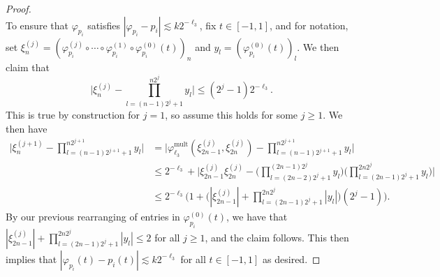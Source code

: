 \documentclass[a4paper, 11pt, headings = small, abstract]{scrartcl}
\begin{document}
\begin{proof}
\[	\]
	To ensure that $\varphi_{p_i}$ satisfies $|\varphi_{p_i}-p_i|\lesssim k2^{-\ell_3}$, fix $t\in[-1, 1]$, and for notation, set $\xi^{(j)}_n=(\varphi_{p_i}^{(j)}\circ\cdots\circ\varphi_{p_i}^{(1)}\circ\varphi_{p_i}^{(0)}(t))_n$ and $y_l=(\varphi_{p_i}^{(0)}(t))_l$.
	We then claim that
	\[
		\Big|\xi^{(j)}_{n}-\prod_{l=(n-1)2^j+1}^{n2^j}y_l\Big|
		\le (2^j-1)2^{-\ell_3}.
	\]
	This is true by construction for $j=1$, so assume this holds for some $j\ge1$.
	We then have
	\begin{align*}
		\bigg|\xi^{(j+1)}_{n}-\prod_{l=(n-1)2^{j+1}+1}^{n2^{j+1}}y_l\bigg|
		&=\bigg|\varphi^{\mathrm{mult}}_{\ell_3}(\xi^{(j)}_{2n-1}, \xi^{(j)}_{2n})-\prod_{l=(n-1)2^{j+1}+1}^{n2^{j+1}}y_l\bigg| \\
		&\le 2^{-\ell_3}+\bigg|\xi_{2n-1}^{(j)}\xi_{2n}^{(j)}-\bigg(\prod_{l=(2n-2)2^j+1}^{(2n-1)2^j}y_l\bigg)\bigg(\prod_{l=(2n-1)2^j+1}^{2n2^j}y_l\bigg)\bigg| \\
		&\le2^{-\ell_3}\bigg(1+\bigg(|\xi_{2n-1}^{(j)}|+\prod_{l=(2n-1)2^j+1}^{2n2^j}|y_l|\bigg)(2^{j}-1)\bigg).
	\end{align*}
	By our previous rearranging of entries in $\varphi_{p_i}^{(0)}(t)$, we have that $|\xi_{2n-1}^{(j)}|+\prod_{l=(2n-1)2^j+1}^{2n2^j}|y_l|\le 2$ for all $j\ge1$, and the claim follows.
	This then implies that $|\varphi_{p_i}(t)-p_i(t)|\lesssim k2^{-\ell_3}$ for all $t\in[-1, 1]$ as desired.


\end{proof}
\end{document}
